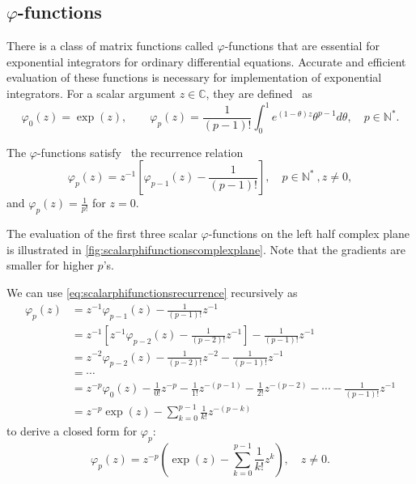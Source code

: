 \subsection{\texorpdfstring{$\varphi$}{Phi}-functions}
There is a class of matrix functions called $\varphi$-functions that are essential
for exponential integrators for ordinary differential equations. Accurate and efficient
evaluation of these functions is necessary for implementation of exponential integrators.
For a scalar argument $z \in \mathbb{C}$, they are defined~\cite{higham2008functions} as
\begin{equation}
    \label{eq:scalarphifunctionsdefinition}
    \varphi_0(z) = \exp(z), \qquad
    \varphi_p(z) = \frac{1}{(p-1)!} \int_{0}^{1}{e^{(1 - \theta)z} \theta^{p-1} d\theta},
    \quad p \in \mathbb{N^*}.
\end{equation}

The $\varphi$-functions satisfy~\cite{higham2008functions} the recurrence relation
\begin{equation}
    \label{eq:scalarphifunctionsrecurrence}
    \varphi_p(z) = z^{-1} \left[ \varphi_{p-1}(z) - \frac{1}{(p-1)!} \right] ,
    \quad p \in \mathbb{N^*} \:, z \neq 0,
\end{equation}
and $\varphi_p(z) = \frac{1}{p!}$ for $z=0$.

The evaluation of the first three scalar $\varphi$-functions on the left half complex plane
is illustrated in \autoref{fig:scalarphifunctionscomplexplane}. Note that the gradients are
smaller for higher $p$'s.


We can use \eqref{eq:scalarphifunctionsrecurrence} recursively as
\begin{equation*}
    \begin{aligned}
        \varphi_p(z) & = z^{-1} \varphi_{p-1}(z) - \frac{1}{(p-1)!} z^{-1} \\
        & = z^{-1} \left[ z^{-1} \varphi_{p-2}(z) - \frac{1}{(p-2)!} z^{-1} \right] - \frac{1}{(p-1)!} z^{-1} \\
        & = z^{-2} \varphi_{p-2}(z) - \frac{1}{(p-2)!} z^{-2} - \frac{1}{(p-1)!} z^{-1} \\
        & = \cdots \\
        & = z^{-p} \varphi_{0}(z) - \frac{1}{0!} z^{-p} - \frac{1}{1!} z^{-(p-1)} - \frac{1}{2!} z^{-(p-2)} - \cdots - \frac{1}{(p-1)!} z^{-1} \\
        & = z^{-p} \exp(z) - \sum_{k=0}^{p-1}{\frac{1}{k!}z^{-(p-k)}}
        \end{aligned}
\end{equation*}
to derive a closed form for $\varphi_p$:
\begin{equation}
    \label{eq:scalarphifunctionsclosedform}
    \varphi_p(z) = z^{-p} \left( \exp(z) - \sum_{k=0}^{p-1}{\frac{1}{k!}z^{k}} \right), \quad z \neq 0.
\end{equation}

